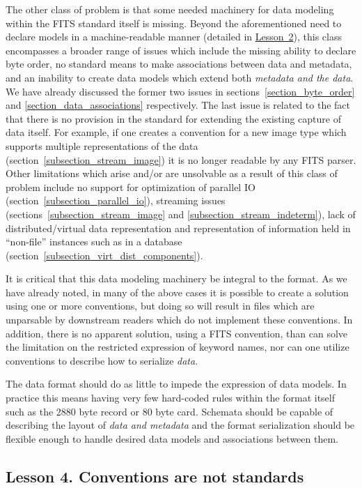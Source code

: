 \documentclass[final,authoryear,5p,times,twocolumn]{elsarticle}
\begin{document}
{{The other class of problem is that some needed machinery for data modeling
within the FITS standard itself is missing. Beyond the aforementioned need to
declare models in a machine-readable manner (detailed in
\hyperref[section_lesson_2]{Lesson~2}), this class encompasses a broader range
of issues which include the missing ability to declare byte order,
no standard means to make associations between data and metadata, and
an inability to create data models which extend both
\textit{metadata and the data}. We have already discussed the former two 
issues in sections~\ref{section_byte_order} and
\ref{section_data_associations} respectively.  The last issue is related to the fact
that there is no provision in the standard for extending the existing capture
of data itself. For example, if one creates a convention for a new image type
which supports multiple representations of the data (section~\ref{subsection_stream_image})
it is no longer readable by any FITS parser. Other limitations which arise and/or are
unsolvable as a result of this class of problem include no support for 
optimization of parallel IO (section~\ref{subsection_parallel_io}), streaming issues
(sections~\ref{subsection_stream_image} and \ref{subsection_stream_indeterm}),
lack of distributed/virtual data representation
and representation of information held in ``non-file'' instances such as in a
database (section~\ref{subsection_virt_dist_components}).


It is critical that this data modeling machinery be integral to the format.
As we have already noted, in many of the above cases it is possible to
create a solution using one or more conventions, but doing so will
result in files which are unparsable by downstream readers which
do not implement these conventions. In addition, there is no apparent
solution, using a FITS convention, than can solve the limitation on the
restricted expression of keyword names, nor can one utilize conventions
to describe how to serialize \textit{data}.


The data format should do as little to impede the expression of data
models.  In practice this means having very few hard-coded rules
within the format itself such as the 2880 byte record or 80 byte card.
Schemata should be capable of describing the layout of \textit{data and metadata}
 and the format serialization should be flexible enough to handle
desired data models and associations between them.


\subsection{Lesson 4. Conventions are not standards}

}}
\end{document}

